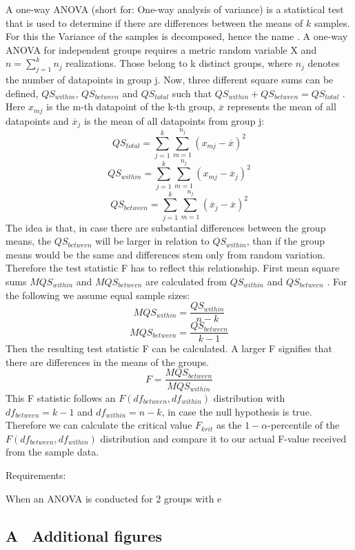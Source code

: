 \documentclass[12 pt]{scrartcl}
\begin{document}
A one-way ANOVA (short for: One-way analysis of variance) is a statistical test that is used to determine if there are differences between the means of $k$ samples.
For this the Variance of the samples is decomposed, hence the name \citep[p.~392]{eid2017statistik}.
A one-way ANOVA for independent groups requires a metric random variable X and $n = \sum^{k}_{j=1} n_{j}$ realizations. Those belong to k distinct groups, where $n_{j}$ denotes the number of datapoints in group j.
Now, three different square sums can be defined, $QS_{within}$, $QS_{between}$ and $QS_{total}$ such that $QS_{within} + QS_{between} = QS_{total}$ \citep[p.~397]{eid2017statistik}. Here $x_{mj}$ is the m-th datapoint of the k-th group, $\overline{x}$ represents the mean of all datapoints and $\overline{x}_j$ is the mean of all datapoints from group j:
\[ QS_{total} = \sum^{k}_{j=1} \sum^{n_j}_{m=1} ( x_{mj} - \overline{x} )^2 \]
\[ QS_{within} = \sum^{k}_{j=1} \sum^{n_j}_{m=1} ( x_{mj} - \overline{x}_j )^2 \]
\[ QS_{between} = \sum^{k}_{j=1} \sum^{n_j}_{m=1} ( \overline{x}_j - \overline{x} )^2 \]
The idea is that, in case there are substantial differences between the group means, the $QS_{between}$ will be larger in relation to $QS_{within}$, than if the group means would be the same and differences stem only from random variation. Therefore the test statistic F has to reflect this relationship. First mean square sums $MQS_{within}$ and $MQS_{between}$ are calculated from $QS_{within}$ and $QS_{between}$ \citep[p.~397]{eid2017statistik}. For the following we assume equal sample sizes:
\[ MQS_{within} = \frac{QS_{within}}{n-k} \]
\[ MQS_{between} = \frac{QS_{between}}{k-1} \]
Then the resulting test statistic F can be calculated. A larger F signifies that there are differences in the means of the groups.
\[ F = \frac{MQS_{between}}{MQS_{within}} \]
This F statistic follows an $F(df_{between},df_{within})$ distribution with $df_{between} = k-1$ and $df_{within} = n - k$, in case the null hypothesis is true.
Therefore we can calculate the critical value $F_{krit}$ as the $1-\alpha$-percentile of the $F(df_{between},df_{within})$ distribution and compare it to our actual F-value received from the sample data.


Requirements:


When an ANOVA is conducted for 2 groups with e


\newpage
{}
\renewcommand\refname{Bibliography}



\newpage
\appendix
{}
\subsection*{A \ Additional figures}
\end{document}
